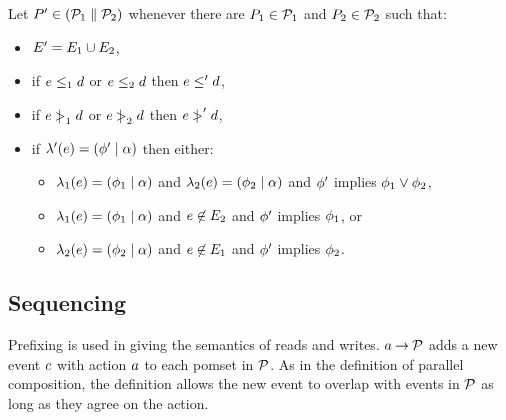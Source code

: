 \begin{definition}
Let $P' \in (\mathcal{P}_1 \parallel \mathcal{P}_2)$
whenever there are $P_1 \in \mathcal{P}_1$ and $P_2 \in \mathcal{P}_2$ such that:
\begin{itemize}
\item $E' = E_1 \cup E_2$,
\item if $e \le_1 d$ or $e \le_2 d$ then $e \le' d$,
\item if $e \mathrel{\,\mid\!\!\!>}_1 d$ or $e \mathrel{\,\mid\!\!\!>}_2 d$ then $e \mathrel{\,\mid\!\!\!>}' d$,
\item if $\lambda'(e) = (\phi' \mid \alpha)$ then either:
  \begin{itemize}
  \item $\lambda_1(e) = (\phi_1 \mid \alpha)$ and $\lambda_2(e) = (\phi_2 \mid \alpha)$
    and $\phi'$ implies $\phi_1 \lor \phi_2$,
  \item $\lambda_1(e) = (\phi_1 \mid \alpha)$ and $e \not\in E_2$
    and $\phi'$ implies $\phi_1$, or
  \item $\lambda_2(e) = (\phi_2 \mid \alpha)$ and $e \not\in E_1$
    and $\phi'$ implies $\phi_2$.
  \end{itemize}
\end{itemize}
\end{definition}


\subsection{Sequencing}
Prefixing is used in giving the semantics of reads and writes.
$a\mathbin\rightarrow\mathcal{P}$ adds a new event $c$ with action $a$ to each
pomset in $\mathcal{P}$.  As in the definition of parallel composition, the
definition allows the new event to overlap with events in $\mathcal{P}$ as long as
they agree on the action.

